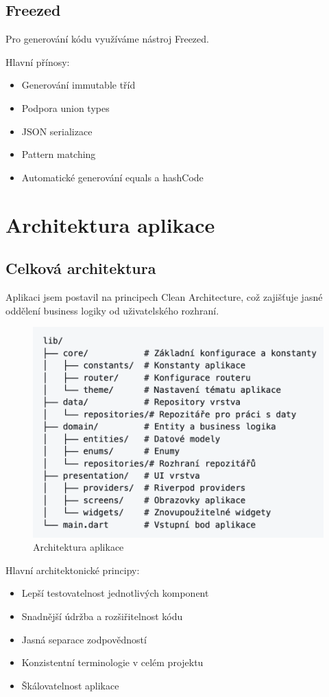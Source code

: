 \documentclass[12pt, a4paper, oneside]{report}
\begin{document}
	\section{Freezed}
	Pro generování kódu využíváme nástroj Freezed.

	Hlavní přínosy:
	\begin{itemize}
		\item Generování immutable tříd
		\item Podpora union types
		\item JSON serializace
		\item Pattern matching
		\item Automatické generování equals a hashCode
	\end{itemize}

\chapter{Architektura aplikace}
	\section{Celková architektura}
	Aplikaci jsem postavil na principech Clean Architecture, což zajišťuje jasné oddělení business logiky od uživatelského rozhraní.

	\begin{figure}[h]
		\centering
		\includegraphics[width=0.8\linewidth]{../image/diagram-architektura.png}
		\caption{Architektura aplikace}
		\label{fig:architecture}
	\end{figure}

	Hlavní architektonické principy:
	\begin{itemize}
		\item Lepší testovatelnost jednotlivých komponent
		\item Snadnější údržba a rozšiřitelnost kódu
		\item Jasná separace zodpovědností
		\item Konzistentní terminologie v celém projektu
		\item Škálovatelnost aplikace
	\end{itemize}
\end{document}
